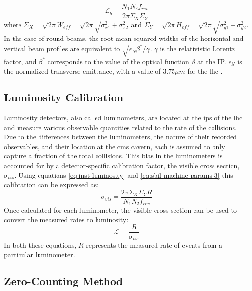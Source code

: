 \begin{equation}
\label{eq:sbil-machine-params-6}
\mathcal{L}_b = \frac{N_1 N_2 f_{rev}}{2 \pi \Sigma_X \Sigma_Y}
\end{equation}
where $\Sigma_X = \sqrt{2\pi} W_{eff} = \sqrt{2\pi} \sqrt{\sigma_{x1}^2 + \sigma_{x2}^2}$ and $\Sigma_Y = \sqrt{2\pi} H_{eff} = \sqrt{2\pi} \sqrt{\sigma_{y1}^2 + \sigma_{y2}^2}$. In the case of round beams, the root-mean-squared widths of the horizontal and vertical beam profiles are equivalent to $\sqrt{\epsilon_{N} \beta^{*} / \gamma}$. $\gamma$ is the relativistic Lorentz factor, and $\beta^{*}$ corresponds to the value of the optical function $\beta$ at the IP. $\epsilon_{N}$ is the normalized transverse emittance, with a value of $3.75\mu m$ for the \acrshort{lhc} \cite{Brüning:782076}.

\subsection{Luminosity Calibration}
\label{subsec:luminosity_calibration}

Luminosity detectors, also called luminometers, are located at the \acrshort{ip}s of the \acrshort{lhc} and measure various observable quantities related to the rate of the collisions. Due to the differences between the luminometers, the nature of their recorded observables, and their location at the \acrshort{cms} cavern, each is assumed to only capture a fraction of the total collisions. This bias in the luminometers is accounted for by a detector-specific calibration factor, the visible cross section, $\sigma_{vis}$. Using equations \ref{eq:inst-luminosity} and \ref{eq:sbil-machine-params-3} this calibration can be expressed as:
\begin{equation}
    \label{eq:vis-cross-section}
    \sigma_{vis} = \frac{2 \pi \Sigma_X \Sigma_Y R}{N_1 N_2 f_{rev}}
\end{equation}
Once calculated for each luminometer, the visible cross section can be used to convert the measured rates to luminosity:
\begin{equation}
    \label{eq:luminosity-from-rates}
    \mathcal{L} = \frac{R}{\sigma_{vis}}
\end{equation}
In both these equations, $R$ represents the measured rate of events from a particular luminometer.

\subsection{Zero-Counting Method}
\label{subsec:zero-counting}

